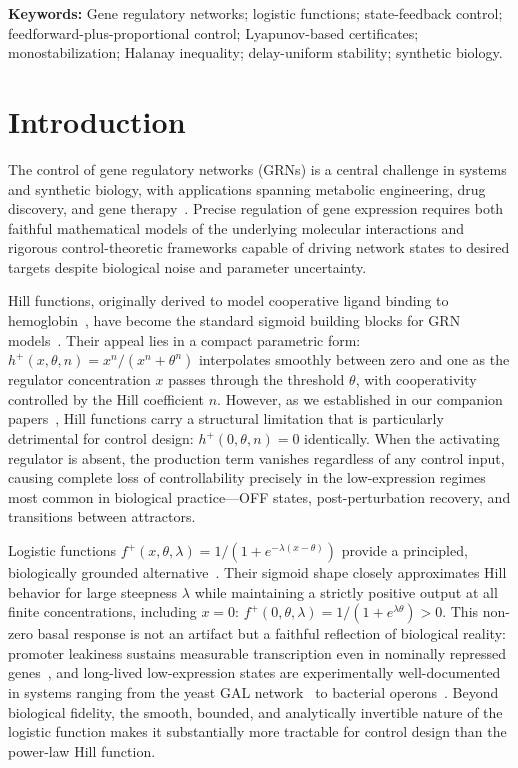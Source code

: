 \documentclass[12pt]{article}
\begin{document}
\medskip
\noindent\textbf{Keywords:} Gene regulatory networks; logistic functions; state-feedback control; feedforward-plus-proportional control; Lyapunov-based certificates; monostabilization; Halanay inequality; delay-uniform stability; synthetic biology.


\section{Introduction}
\label{sec:intro}

The control of gene regulatory networks (GRNs) is a central challenge in systems
and synthetic biology, with applications spanning metabolic engineering, drug
discovery, and gene therapy~\cite{alon2006introduction,dejong2002modeling}. Precise
regulation of gene expression requires both faithful mathematical models of the
underlying molecular interactions and rigorous control-theoretic frameworks capable
of driving network states to desired targets despite biological noise and parameter
uncertainty.

Hill functions, originally derived to model cooperative ligand binding to
hemoglobin~\cite{hill1910possible,weiss1997hill}, have become the standard sigmoid
building blocks for GRN models~\cite{dejong2002modeling,alon2006introduction}. Their
appeal lies in a compact parametric form: $h^+(x,\theta,n) = x^n/(x^n+\theta^n)$
interpolates smoothly between zero and one as the regulator concentration $x$ passes
through the threshold $\theta$, with cooperativity controlled by the Hill coefficient
$n$. However, as we established in our companion
papers~\cite{belgacem2025exploring,belgacem2026logistic}, Hill functions carry a
structural limitation that is particularly detrimental for control design:
$h^+(0,\theta,n) = 0$ identically. When the activating regulator is absent, the
production term vanishes regardless of any control input, causing complete loss of
controllability precisely in the low-expression regimes most common in biological
practice---OFF states, post-perturbation recovery, and transitions between attractors.

Logistic functions $f^+(x,\theta,\lambda) = 1/(1+e^{-\lambda(x-\theta)})$ provide a
principled, biologically grounded alternative~\cite{belgacem2025exploring,belgacem2026logistic,belgacem2026beyond}. Their sigmoid shape closely approximates
Hill behavior for large steepness $\lambda$ while maintaining a strictly positive
output at all finite concentrations, including $x = 0$:
$f^+(0,\theta,\lambda) = 1/(1+e^{\lambda\theta}) > 0$. This non-zero basal response
is not an artifact but a faithful reflection of biological reality: promoter leakiness
sustains measurable transcription even in nominally repressed genes~\cite{huang2015effects},
and long-lived low-expression states are experimentally well-documented in systems
ranging from the yeast GAL network~\cite{acar2005enhancement} to bacterial
operons~\cite{jacob1961genetic}. Beyond biological fidelity, the smooth, bounded, and
analytically invertible nature of the logistic function makes it substantially more
tractable for control design than the power-law Hill function.
\end{document}
